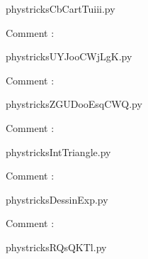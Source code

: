 
    \newcommand{\CaptionFigCbCartTuiii}{<+Type your caption here+>}
    \begin{center}
        
    \end{center}
    phystricksCbCartTuiii.py

    Comment : 

    \clearpage
    


    \newcommand{\CaptionFigUYJooCWjLgK}{<+Type your caption here+>}
    \begin{center}
        
    \end{center}
    phystricksUYJooCWjLgK.py

    Comment : 

    \clearpage
    


    \newcommand{\CaptionFigZGUDooEsqCWQ}{<+Type your caption here+>}
    \begin{center}
        
    \end{center}
    phystricksZGUDooEsqCWQ.py

    Comment : 

    \clearpage
    


    \newcommand{\CaptionFigIntTriangle}{<+Type your caption here+>}
    \begin{center}
        
    \end{center}
    phystricksIntTriangle.py

    Comment : 

    \clearpage
    


    \newcommand{\CaptionFigDessinExp}{<+Type your caption here+>}
    \begin{center}
        
    \end{center}
    phystricksDessinExp.py

    Comment : 

    \clearpage
    


    \newcommand{\CaptionFigRQsQKTl}{<+Type your caption here+>}
    \begin{center}
        
    \end{center}
    phystricksRQsQKTl.py

